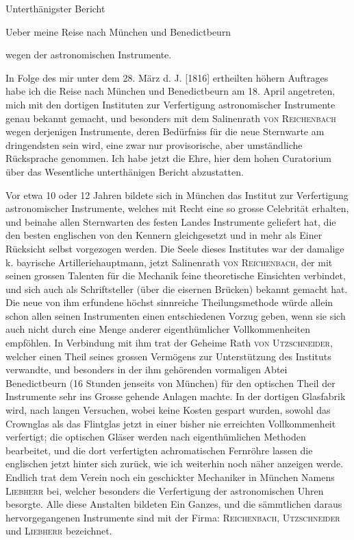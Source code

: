 \clearpage\begingroup
\hypertarget{native-310-lower}{}
\begin{center}Unterthänigster Bericht\par\smallskip
Ueber meine Reise nach München und Benedictbeurn\par
wegen der astronomischen Instrumente.\end{center}

\noindent\hspace*{\parindent}In Folge des mir unter dem 28. März d. J. [1816] ertheilten höhern Auftrages habe ich die Reise nach München und Benedictbeurn am 18. April angetreten, mich mit den dortigen Instituten zur Verfertigung astronomischer Instrumente genau bekannt gemacht, und besonders mit dem Salinenrath \textsc{von Reichenbach} wegen derjenigen Instrumente, deren Bedürfniss für die neue Sternwarte am dringendsten sein wird, eine zwar nur provisorische, aber umständliche Rücksprache genommen. Ich habe jetzt die Ehre, hier dem hohen Curatorium über das Wesentliche unterthänigen Bericht abzustatten.

Vor etwa 10 oder 12 Jahren bildete sich in München das Institut zur Verfertigung astronomischer Instrumente, welches mit Recht eine so grosse Celebrität erhalten, und beinahe allen Sternwarten des festen Landes Instrumente geliefert hat, die den besten englischen von den Kennern gleichgesetzt und in mehr als Einer Rücksicht selbst vorgezogen werden. Die Seele dieses Institutes war der damalige k. bayrische Artilleriehauptmann, jetzt Salinenrath \textsc{von Reichenbach}, der mit seinen grossen Talenten für die Mechanik feine theoretische Einsichten verbindet, und sich auch als Schriftsteller (über die eisernen Brücken) bekannt gemacht hat. Die neue von ihm erfundene höchst sinnreiche Theilungsmethode würde allein schon allen seinen Instrumenten einen entschiedenen Vorzug geben, wenn sie sich auch nicht durch eine Menge anderer eigenthümlicher Vollkommenheiten empföhlen. In Verbindung mit ihm trat der Geheime Rath \textsc{von Utzschneider}, welcher einen Theil seines
\clearpage{}
\noindent grossen Vermögens zur Unterstützung des Instituts verwandte, und besonders in der ihm gehörenden vormaligen Abtei Benedictbeurn (16 Stunden jenseits von München) für den optischen Theil der Instrumente sehr ins Grosse gehende Anlagen machte. In der dortigen Glasfabrik wird, nach langen Versuchen, wobei keine Kosten gespart wurden, sowohl das Crownglas als das Flintglas jetzt in einer bisher nie erreichten Vollkommenheit verfertigt; die optischen Gläser werden nach eigenthümlichen Methoden bearbeitet, und die dort verfertigten achromatischen Fernröhre lassen die englischen jetzt hinter sich zurück, wie ich weiterhin noch näher anzeigen werde. Endlich trat dem Verein noch ein geschickter Mechaniker in München Namens \textsc{Liebherr} bei, welcher besonders die Verfertigung der astronomischen Uhren besorgte. Alle diese Anstalten bildeten Ein Ganzes, und die sämmtlichen daraus hervorgegangenen Instrumente sind mit der Firma: \textsc{Reichenbach, Utzschneider} und \textsc{Liebherr} bezeichnet.

